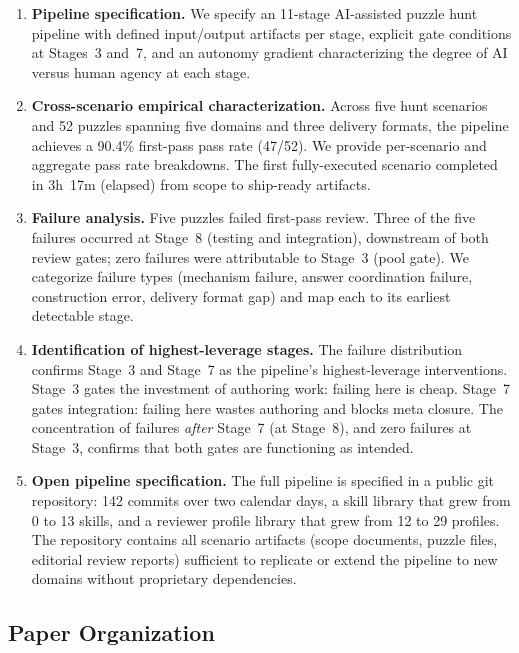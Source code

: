 \begin{enumerate}
  \item \textbf{Pipeline specification.} We specify an 11-stage AI-assisted puzzle hunt
  pipeline with defined input/output artifacts per stage, explicit gate conditions at
  Stages~3 and~7, and an autonomy gradient characterizing the degree of AI versus human
  agency at each stage.

  \item \textbf{Cross-scenario empirical characterization.} Across five hunt scenarios and
  52 puzzles spanning five domains and three delivery formats, the pipeline achieves a
  90.4\% first-pass pass rate (47/52). We provide per-scenario and aggregate pass rate
  breakdowns. The first fully-executed scenario completed in 3h~17m (elapsed) from scope to ship-ready
  artifacts.

  \item \textbf{Failure analysis.} Five puzzles failed first-pass review. Three of the five
  failures occurred at Stage~8 (testing and integration), downstream of both review gates;
  zero failures were attributable to Stage~3 (pool gate). We categorize failure types
  (mechanism failure, answer coordination failure, construction error, delivery format gap)
  and map each to its earliest detectable stage.

  \item \textbf{Identification of highest-leverage stages.} The failure distribution
  confirms Stage~3 and Stage~7 as the pipeline's highest-leverage interventions. Stage~3
  gates the investment of authoring work: failing here is cheap. Stage~7 gates integration:
  failing here wastes authoring and blocks meta closure. The concentration of failures
  \emph{after} Stage~7 (at Stage~8), and zero failures at Stage~3, confirms that both gates
  are functioning as intended.

  \item \textbf{Open pipeline specification.} The full pipeline is specified in a public git
  repository: 142 commits over two calendar days, a skill library that grew from 0 to 13
  skills, and a reviewer profile library that grew from 12 to 29 profiles. The repository
  contains all scenario artifacts (scope documents, puzzle files, editorial review reports)
  sufficient to replicate or extend the pipeline to new domains without proprietary
  dependencies.
\end{enumerate}

\subsection*{Paper Organization}

